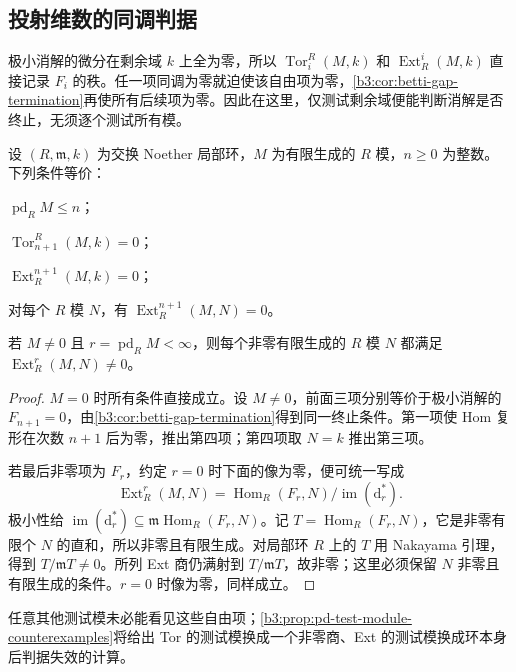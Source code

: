 \subsection{投射维数的同调判据}
\label{b3:subsec:1702:02}

极小消解的微分在剩余域 \(k\) 上全为零，所以 \(\operatorname{Tor}_i^R(M,k)\) 和 \(\operatorname{Ext}_R^i(M,k)\) 直接记录 \(F_i\) 的秩。任一项同调为零就迫使该自由项为零，\cref{b3:cor:betti-gap-termination}再使所有后续项为零。因此在这里，仅测试剩余域便能判断消解是否终止，无须逐个测试所有模。

\begin{theorem}\label{b3:thm:local-pd-vanishing}
	设 \((R,\mathfrak m,k)\) 为交换 Noether 局部环，\(M\) 为有限生成的 \(R\) 模，\(n\ge0\) 为整数。下列条件等价：
	\begin{equivalences}
		\item \(\operatorname{pd}_RM\le n\)；
		\item \(\operatorname{Tor}_{n+1}^R(M,k)=0\)；
		\item \(\operatorname{Ext}_R^{n+1}(M,k)=0\)；
		\item 对每个 \(R\) 模 \(N\)，有 \(\operatorname{Ext}_R^{n+1}(M,N)=0\)。
	\end{equivalences}
	若 \(M\ne0\) 且 \(r=\operatorname{pd}_RM<\infty\)，则每个非零有限生成的 \(R\) 模 \(N\) 都满足 \(\operatorname{Ext}_R^r(M,N)\ne0\)。
\end{theorem}
\begin{proof}
	\(M=0\) 时所有条件直接成立。设 \(M\ne0\)，前面三项分别等价于极小消解的 \(F_{n+1}=0\)，由\cref{b3:cor:betti-gap-termination}得到同一终止条件。第一项使 Hom 复形在次数 \(n+1\) 后为零，推出第四项；第四项取 \(N=k\) 推出第三项。

	若最后非零项为 \(F_r\)，约定 \(r=0\) 时下面的像为零，便可统一写成
	\[
		\operatorname{Ext}_R^r(M,N) =\operatorname{Hom}_R(F_r,N)/\operatorname{im}(\mathrm{d}_r^*).
	\]
	极小性给 \(\operatorname{im}(\mathrm{d}_r^*)\subseteq\mathfrak m\operatorname{Hom}_R(F_r,N)\)。记 \(T=\operatorname{Hom}_R(F_r,N)\)，它是非零有限个 \(N\) 的直和，所以非零且有限生成。对局部环 \(R\) 上的 \(T\) 用 Nakayama 引理，得到 \(T/\mathfrak mT\ne0\)。所列 Ext 商仍满射到 \(T/\mathfrak mT\)，故非零；这里必须保留 \(N\) 非零且有限生成的条件。\(r=0\) 时像为零，同样成立。
\end{proof}

任意其他测试模未必能看见这些自由项；\cref{b3:prop:pd-test-module-counterexamples}将给出 Tor 的测试模换成一个非零商、Ext 的测试模换成环本身后判据失效的计算。

